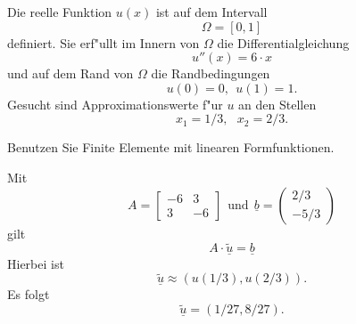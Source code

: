 Die reelle Funktion $u(x)$ ist auf dem Intervall
\[
\Omega = [0, 1]
\]
definiert. Sie erf"ullt im Innern von $\Omega$ die Differentialgleichung 
\[
u''(x) = 6 \cdot x
\]
und auf dem Rand von $\Omega$ die Randbedingungen 
\[
u(0) = 0, \ \ u(1) = 1.
\]
Gesucht sind Approximationswerte f"ur $u$ an den Stellen
\[
x_1 = 1/3, \ \ \  x_2 = 2/3.
\]

Benutzen Sie Finite Elemente mit linearen Formfunktionen.

\begin{loesung}
Mit
\[
A = \left[\begin{array}{rr} -6 & 3 \\ 3 & -6  \end{array}\right] \ \ \mbox{und} \ \
  \underline{b} =  \left(\begin{array}{r} 2/3 \\ -5/3 \end{array}\right)
\]
gilt  
\[
A \cdot \underline{\tilde u} = \underline{b}
\]
Hierbei ist
\[
\underline{\tilde u} \approx (u(1/3), u(2/3)).
\]
Es folgt 
\[
\underline{\tilde u} = (1/27, 8/27).
\]
\end{loesung}

